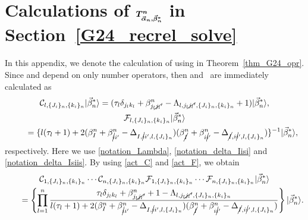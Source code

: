 \documentclass[pdftex]{sigma}
\numberwithin{equation}{section}
\begin{document}
\section[Calculations of T\string^n in Section 3.3]{Calculations of $\boldsymbol{T^{n}_{\protect\vec{\alpha}_{n},\protect\vec{\beta}_{n}^{\ast}}}$ in Section~\ref{G24_recrel_solve}}
\label{appendix_coeff_T}


In this appendix, we denote the calculation of  using
in
Theorem~\ref{thm_G24_opr}. Since
and
depend on only number operators, then
and~
are immediately calculated as
\begin{gather}
\mathcal{C}_{
l,
\{
J_{i}
\}_{n}
,
\{
k_{i}
\}_{n}
}
|
\vec{\beta}_{n}^{\ast}
\rangle
=
 (
 \tau_{l}
 \delta_{j_{l}k_{l}}
 +
 \beta_{j_{l}\cancel{j_{l}}'}^{n}
 -
 \Lambda_{
 l,
 j_{l}\cancel{j_{l}}',
 \{
 J_{i}
 \}_{n}
 ,
 \{
 k_{i}
 \}_{n}
 }
 +
 1
 )
|
\vec{\beta}_{n}^{\ast}
\rangle,
\label{act_C}
\\
\mathcal{F}_{
l,
\{
J_{i}
\}_{n}
,
\{
k_{i}
\}_{n}
}
|
\vec{\beta}_{n}^{\ast}
\rangle\nonumber\\
\qquad
=
\{
 l
 (
 \tau_{l}
 +
 1
 )
 +
 2
 (
 \beta_{I}^{n}
 +
 \beta_{\cancel{i}i'}^{n}
 -
 \Delta_{
 I,
 \cancel{i}i',
 l,
 \{
 J_{i}
 \}_{n}
 }
 )
 (
 \beta_{\cancel{I}}^{n}
 +
 \beta_{i\cancel{i}'}^{n}
 -
 \Delta_{
 \cancel{I},
 i\cancel{i}',
 l,
 \{
 J_{i}
 \}_{n}
 }
 )
\}^{-1}
|
\vec{\beta}_{n}^{\ast}
\rangle,
\label{act_F}
\end{gather}
respectively.
Here we use \eqref{notation_Lambda}, \eqref{notation_delta_Iisi} and \eqref{notation_delta_Isiis}.
By using \eqref{act_C} and \eqref{act_F}, we obtain
\begin{gather}
 \mathcal{C}_{
 1,
 \{
 J_{i}
 \}_{n}
 ,
 \{
 k_{i}
 \}_{n}
 }
 \cdots
 \mathcal{C}_{
 n,
 \{
 J_{i}
 \}_{n}
 ,
 \{
 k_{i}
 \}_{n}
 }
 \mathcal{F}_{
 1,
 \{
 J_{i}
 \}_{n}
 ,
 \{
 k_{i}
 \}_{n}
 }
 \cdots
 \mathcal{F}_{
 n,
 \{
 J_{i}
 \}_{n}
 ,
 \{
 k_{i}
 \}_{n}
 }
|
 \vec{\beta}_{n}^{\ast}
\rangle
 \nonumber
 \\
\qquad
 =
 \left\{
 \prod_{l=1}^{n}
 \frac{
 \tau_{l}
 \delta_{j_{l}k_{l}}
 +
 \beta_{j_{l}\cancel{j_{l}}'}^{n}
 +
 1
 -
 \Lambda_{
 l,
 j_{l}\cancel{j_{l}}',
 \{
 J_{i}
 \}_{n}
 ,
 \{
 k_{i}
 \}_{n}
 }
 }{
 l
 (
 \tau_{l}+1
 )
 +
 2
 (
 \beta_{I}^{n}
 +
 \beta_{\cancel{i}i'}^{n}
 -
 \Delta_{
 I,
 \cancel{i}i',
 l,
 \{
 J_{i}
 \}_{n}
 }
 )
 (
 \beta_{\cancel{I}}^{n}
 +
 \beta_{i\cancel{i}'}^{n}
 -
 \Delta_{
 \cancel{I},
 i\cancel{i}',
 l,
 \{
 J_{i}
 \}_{n}
 }
 )
 }
 \right\}
|
 \vec{\beta}_{n}^{\ast}
\rangle . \label{act_CandF}
\end{gather}
\end{document}

